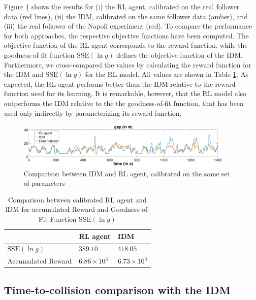 \documentclass[review]{elsarticle}
\providecommand{\3}{{\ss}}
\begin{document}
	Figure \ref{fig:IDMvsRL} shows the results for (i) the RL
	agent, calibrated on the real follower data (red lines), (ii) the IDM,
	calibrated on the same follower data (amber), and (iii) the real
	follower of the Napoli experiment (red). To compare the
	performance for both approaches, the respective objective functions
	have been computed. The objective function of the RL agent corresponds
	to the reward function, while the goodness-of-fit function
	$\mathrm{SSE}(\ln g)$ defines the objective function of the
	IDM. Furthermore, we cross-compared the values by calculating the
	reward function for the IDM and $\mathrm{SSE}(\ln g)$ for the RL model. All
	values are shown in Table \ref{tab:objectiveFunc}. 
	As expected, the RL agent performs better than the IDM relative to the
	reward function used for its learning. It is remarkable, however, 
	that the RL model also outperforms the IDM relative to the
	the goodness-of-fit function, that has been used only indirectly by
	parameterizing its reward function.
	
	\begin{figure}
		
		\centering
		\includegraphics[width=0.95\textwidth]{images/IDMvsRL_dist}
		\caption{Comparison between IDM and RL agent, calibrated on the same set of parameters}
		\label{fig:IDMvsRL}
	\end{figure}
	
	\begin{table}
		\caption{Comparison between calibrated RL agent and IDM for
			accumulated Reward and Goodness-of-Fit Function $\mathrm{SSE}(\ln g)$} 
		\label{tab:objectiveFunc} 
		\begin{center}
			\begin{tabular}{p{} | p{0.2\textwidth} p{}  } 
				& RL agent & IDM   \\ \hline
				$\mathrm{SSE}(\ln g)$ & $389.10$ &  $418.05$	\\
				Accumulated Reward &  $6.86 \times 10^3$   & $6.73\times 10^3$			
			\end{tabular}
		\end{center}
	\end{table}
	
	\subsection{Time-to-collision comparison with the IDM}
	
\end{document}
